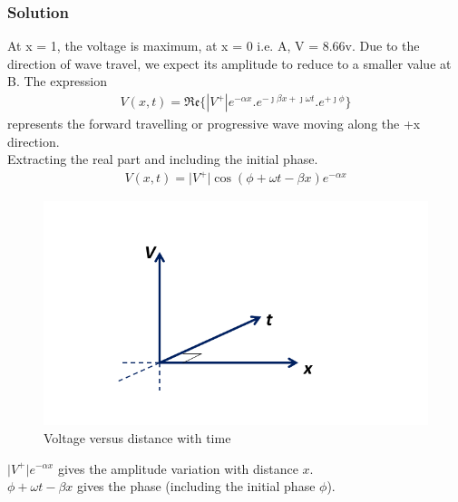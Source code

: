 \begin{exmp}
\subsubsection*{Solution}
At x = 1, the voltage is maximum, at x = 0 i.e. A, V = 8.66v. Due to the direction of wave travel, we expect its amplitude to reduce to a smaller value at B. The expression
\begin{align}
V(x,t) = \mathfrak{Re}\{\left| V^+\right| e^{-\alpha x}.e^{-\jmath\beta x + \jmath\omega t}.e^{+\jmath\phi}\} 
\label{eqn:voltagelec3soln}
\end{align}
represents the forward travelling or progressive wave moving along the +x direction.\\
Extracting the real part and including the initial phase.
\begin{align*}
V(x,t) = \lvert V^+\rvert\cos(\phi + \omega t - \beta x)e^{-\alpha x}
\end{align*}
\begin{figure}[h]
\centering
\includegraphics[width=1\linewidth]{graphics/fig3.3}
\caption{Voltage versus distance with time}
\end{figure}

$\lvert V^+\rvert e^{-\alpha x} $ gives the amplitude variation with distance $ x $. \\
$ \phi + \omega t - \beta x $ gives the phase (including the initial phase $ \phi $).


\end{exmp}
